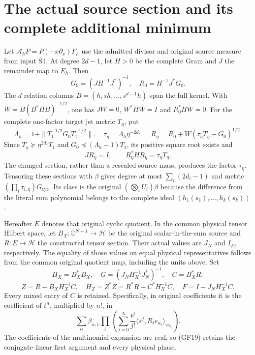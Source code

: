 \documentclass[11pt]{article}
\newcommand{\C}{\mathbb C}\newcommand{\R}{\mathbb R}
\begin{document}
\section{The actual source section and its complete additional minimum}
Let $\mathcal A_hP=P(-x\partial_x)F_h$ use the admitted divisor and
original source measure from input S1. At degree $2d-1$, let $H>0$ be
the complete Gram and $J$ the remainder map to $E_h$.
Then
\[
G_0=(JH^{-1}J^*)^{-1},\quad R_0=H^{-1}J^*G_0.
\]
The $d$ relation columns $B=(h,sh,\ldots,s^{d-1}h)$ span the full
kernel. With $W=B(B^*HB)^{-1/2}$, one has $JW=0$,
$W^*HW=I$ and $R_0^*HW=0$.
For the complete one-factor target jet metric $T_\eta$, put
\[
\Lambda_h=1+\|T_1^{-1/2}G_0T_1^{-1/2}\|,\quad
\tau_\eta=\Lambda_h\eta^{-2d_*},\quad
R_\eta=R_0+W(\tau_\eta T_\eta-G_0)^{1/2}.
\tag{GF16}
\]
Since $T_\eta\succeq\eta^{2d_*}T_1$ and
$G_0\preceq(\Lambda_h-1)T_1$, its positive square root exists and
\[
JR_\eta=I,\qquad R_\eta^*HR_\eta=\tau_\eta T_\eta.
\tag{GF17}
\]
The changed section, rather than a rescaled source mass, produces the
factor $\tau_\eta$. Tensoring these sections with $\beta$ gives degree
at most $\sum_i(2d_i-1)$ and metric
$(\prod_i\tau_{i,\eta})G_{\mathrm{cyc}}$.
Its class is the original $(\bigotimes_i U_i)\beta$ because the
difference from the literal sum polynomial belongs to the complete ideal
$(h_1(s_1),\ldots,h_k(s_k))$.

Hereafter $E$ denotes that original cyclic quotient. In the common
physical tensor Hilbert space, let $B_X:\C^{N+1}\to\mathscr H$ be the
original scalar-in-the-sum source and $R:E\to\mathscr H$ the constructed
tensor section. Their actual values are $J_N$ and $I_E$, respectively.
The equality of those values on equal physical representatives follows
from the common original quotient map, including the units above.
Set
\[
H_X=B_X^*B_X,\quad G=(J_NH_X^{-1}J_N^*)^{-1},\quad C=B_X^*R,
\]
\[
Z=R-B_XH_X^{-1}C,\quad H_Z=Z^*Z=R^*R-C^*H_X^{-1}C,
\quad F=I-J_NH_X^{-1}C.
\tag{GF18}
\]
Every mixed entry of $C$ is retained. Specifically, in original
coefficients it is the coefficient of $t^n$, multiplied by $n!$, in
\[
\sum_\alpha\beta_{\alpha,v}\prod_i
\left(\sum_{j=0}^N\frac{t^j}{j!}
\langle s^j,R_i e_{\alpha_i}\rangle_{w_{h_i}}\right).
\tag{GF19}
\]
The coefficients of the multinomial expansion are real, so (GF19)
retains the conjugate-linear first argument and every physical phase.
\end{document}
